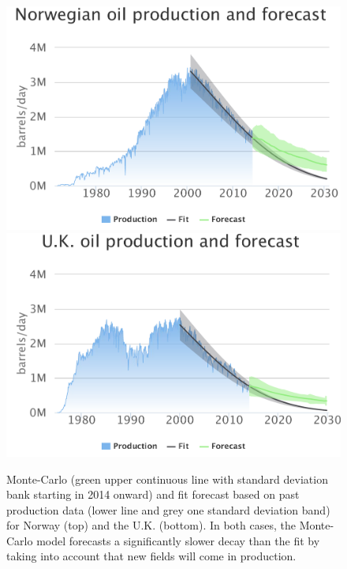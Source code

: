 \documentclass[review]{elsarticle}
\begin{document}
\begin{figure}[H]
\includegraphics[width=1\columnwidth]{NO-future}
\includegraphics[width=1\columnwidth]{UK-future} 
\caption{\doublespacing
Monte-Carlo (green upper continuous line with standard deviation bank starting in 2014 onward) and fit forecast based on past production data (lower line and grey one standard deviation band) for Norway (top) and the U.K. (bottom). In both cases, the Monte-Carlo model forecasts a significantly slower decay than the fit by taking into account that new fields will come in production.}
\label{no_uk_2013} 
\end{figure}
\end{document}
